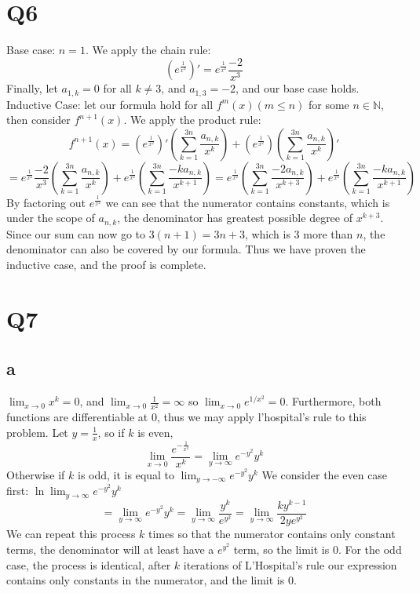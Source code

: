 \documentclass[12pt]{article}
\newcommand{\N}{\mathbb{N}}
\begin{document}
\section{Q6}
Base case: $n=1$. We apply the chain rule:
$$(e^{\frac{1}{x^2}})' = e^{\frac{1}{x^2}}\frac{-2}{x^3}$$
Finally, let $a_{1,k} = 0$ for all $k \not = 3$, and $a_{1,3}=-2$, and our base case holds.
\newline
Inductive Case: let our formula hold for all $f^m(x) (m \leq n)$ for some $n \in \N$, then consider $f^{n+1}(x)$. We apply the product rule:
$$f^{n+1}(x) = (e^{\frac{1}{x^2}})'(\sum_{k=1}^{3n}\frac{a_{n,k}}{x^k}) + (e^{\frac{1}{x^2}})(\sum_{k=1}^{3n}\frac{a_{n,k}}{x^k})'$$
$$= e^{\frac{1}{x^2}}\frac{-2}{x^3}(\sum_{k=1}^{3n}\frac{a_{n,k}}{x^k}) + e^{\frac{1}{x^2}}(\sum_{k=1}^{3n}\frac{-ka_{n,k}}{x^{k+1}})
= e^{\frac{1}{x^2}}(\sum_{k=1}^{3n}\frac{-2a_{n,k}}{x^{k+3}}) + e^{\frac{1}{x^2}}(\sum_{k=1}^{3n}\frac{-ka_{n,k}}{x^{k+1}})$$
By factoring out $e^{\frac{1}{x^2}}$ we can see that the numerator contains constants, which is under the scope of $a_{n,k}$, the denominator has greatest possible degree of $x^{k+3}$. Since our sum can now go to $3(n+1) = 3n+3$, which is $3$ more than $n$, the denominator can also be covered by our formula.
\newline
Thus we have proven the inductive case, and the proof is complete.
\newpage


\section{Q7}
\subsection{a}
$\lim_{x \to 0} x^k = 0$, and $\lim_{x \to 0} \frac{1}{x^2} = \infty$ so $\lim_{x \to 0} e^{1/x^2} = 0$. Furthermore, both functions are differentiable at $0$, thus we may apply l'hospital's rule to this problem. Let $y = \frac{1}{x}$, so if $k$ is even,
$$\lim_{x \to 0} \frac{e^{-\frac{1}{x^2}}}{x^k} = \lim_{y \to \infty}e^{-y^2}y^k$$
Otherwise if $k$ is odd, it is equal to $\lim_{y \to -\infty}e^{-y^2}y^k$
\newline
We consider the even case first: $\ln{\lim_{y \to \infty}e^{-y^2}y^k}$
$$= \lim_{y \to \infty}e^{-y^2}y^k = \lim_{y \to \infty}
\frac{y^k}{e^{y^2}} = \lim_{y \to \infty}\frac{ky^{k-1}}{2ye^{y^2}}$$
We can repeat this process $k$ times so that the numerator contains only constant terms, the denominator will at least have a $e^{y^2}$ term, so the limit is 0.
\newline
For the odd case, the process is identical, after $k$ iterations of L'Hospital's rule our expression contains only constants in the numerator, and the limit is 0.
\end{document}
